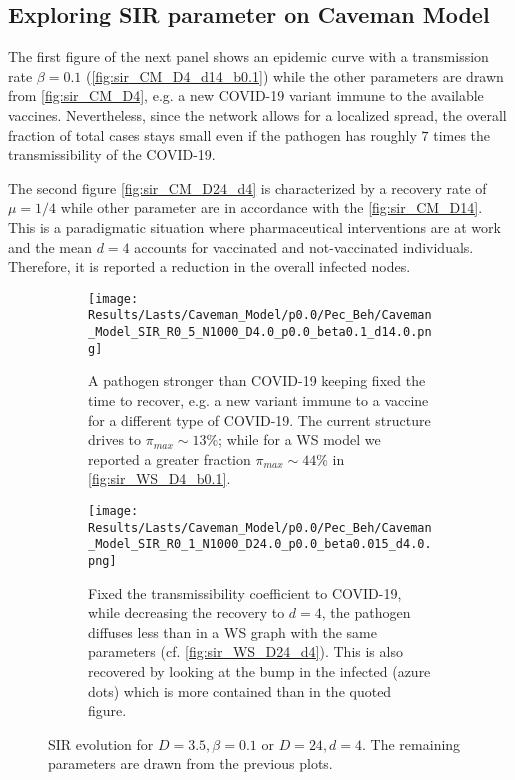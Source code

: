 \documentclass[a4paper,10pt]{book} %
\theoremstyle{definition}
\begin{document}
\clearpage
\subsection*{Exploring SIR parameter on Caveman Model}
The first figure of the next panel shows an epidemic curve with a transmission rate $\beta = 0.1$ (\autoref{fig:sir_CM_D4_d14_b0.1}) while the other parameters are drawn from \autoref{fig:sir_CM_D4}, e.g. a new COVID-19 variant immune to the available vaccines. Nevertheless, since the network allows for a localized spread, the overall fraction of total cases stays small even if the pathogen has roughly $7$ times the transmissibility of the COVID-19.

The second figure \autoref{fig:sir_CM_D24_d4} is characterized by a recovery rate of $ \mu = 1/4$ while other parameter are in accordance with the \autoref{fig:sir_CM_D14}. This is a paradigmatic situation where pharmaceutical interventions are at work and the mean $ d = 4$ accounts for vaccinated and not-vaccinated individuals. Therefore, it is reported a reduction in the overall infected nodes.

\begin{figure}[htbp]
	\centering
	\begin{subfigure}{0.8\linewidth}
		\texttt{[image: Results/Lasts/Caveman\_Model/p0.0/Pec\_Beh/Caveman\_Model\_SIR\_R0\_5\_N1000\_D4.0\_p0.0\_beta0.1\_d14.0.png]}
		\caption{A pathogen stronger than COVID-19 keeping fixed the time to recover, e.g. a new variant immune to a vaccine for a different type of COVID-19. The current structure drives to $ \pi_{max} \sim 13\%$; while for a WS model we reported a greater fraction $ \pi_{max} \sim 44\%$ in \autoref{fig:sir_WS_D4_b0.1}.}
		\label{fig:sir_CM_D4_d14_b0.1}
	\end{subfigure}
	\par\bigskip
	\centering
	\begin{subfigure}{0.8\linewidth}
		\texttt{[image: Results/Lasts/Caveman\_Model/p0.0/Pec\_Beh/Caveman\_Model\_SIR\_R0\_1\_N1000\_D24.0\_p0.0\_beta0.015\_d4.0.png]}
		\caption{Fixed the transmissibility coefficient to COVID-19, while decreasing the recovery to $d = 4$, the pathogen diffuses less than in a WS graph with the same parameters (cf. \autoref{fig:sir_WS_D24_d4}). This is also recovered by looking at the bump in the infected (azure dots) which is more contained than in the quoted figure.}
		\label{fig:sir_CM_D24_d4}
	\end{subfigure}
	\caption{SIR evolution for $D = 3.5, \beta = 0.1$ or $ D=24,d=4$. The remaining parameters are drawn from the previous plots.}
	\label{fig:sir_CMD4b0.1_D14d4}
\end{figure}
\end{document}
